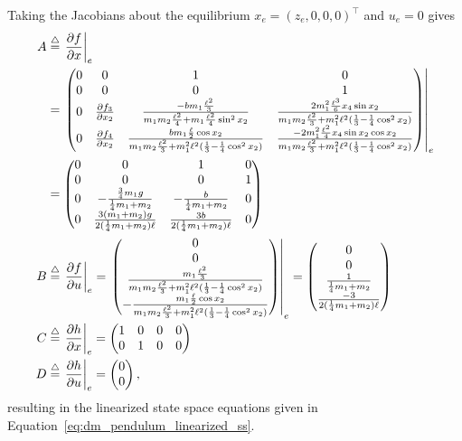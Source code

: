Taking the Jacobians about the equilibrium $x_e=(z_e, 0, 0, 0)^\top$ and $u_e=0$ gives
\begin{align*}
A&\stackrel{\triangle}{=} \left.\frac{\partial f}{\partial x}\right|_e \\
	&= \left.\begin{pmatrix} 
		0 & 0 & 1 & 0 \\
		0 & 0 & 0 & 1 \\
		0 & \frac{\partial f_3}{\partial x_2} & \frac{-bm_1\frac{\ell^2}{3}}{m_1m_2\frac{\ell^2}{4}+m_1\frac{\ell^2}{4}\sin^2 x_2} & \frac{2m_1^2\frac{\ell^3}{6} x_4\sin x_2}{m_1m_2\frac{\ell^2}{3} + m_1^2 \ell^2(\frac{1}{3} -\frac{1}{4}\cos^2x_2)} \\
		0 & \frac{\partial f_4}{\partial x_2} & \frac{bm_1\frac{\ell}{2}\cos x_2}{m_1m_2\frac{\ell^2}{3} + m_1^2 \ell^2(\frac{1}{3} -\frac{1}{4}\cos^2x_2)} & \frac{-2m_1^2\frac{\ell^2}{4} x_4 \sin x_2 \cos x_2}{m_1m_2\frac{\ell^2}{3} + m_1^2 \ell^2(\frac{1}{3} -\frac{1}{4}\cos^2x_2)}  \end{pmatrix}\right|_e \\
		&= \begin{pmatrix} 0 & 0 & 1 & 0 \\ 0 & 0 & 0 & 1 \\ 0 & -\frac{\frac{3}{4} m_1g}{\frac{1}{4}m_1 + m_2} & -\frac{b}{\frac{1}{4}m_1 + m_2} & 0 \\ 0 & \frac{3 (m_1+m_2)g}{2 (\frac{1}{4}m_1 + m_2)\ell} & \frac{3b}{2(\frac{1}{4}m_1 + m_2)\ell} & 0 \end{pmatrix} \\
B&\stackrel{\triangle}{=} \left.\frac{\partial f}{\partial u}\right|_e = \left.\begin{pmatrix} 0 \\ 0 \\ \frac{m_1\frac{\ell^2}{3}}{m_1m_2\frac{\ell^2}{3} + m_1^2 \ell^2(\frac{1}{3} -\frac{1}{4}\cos^2 x_2)} \\ -\frac{m_1\frac{\ell}{2}\cos x_2}{m_1m_2\frac{\ell^2}{3} + m_1^2 \ell^2(\frac{1}{3} -\frac{1}{4}\cos^2x_2)} \end{pmatrix}\right|_e 
= \begin{pmatrix} 0 \\ 0 \\ \frac{1}{\frac{1}{4}m_1 + m_2} \\  \frac{-3}{2(\frac{1}{4}m_1 + m_2)\ell} \end{pmatrix} \\
C&\stackrel{\triangle}{=} \left.\frac{\partial h}{\partial x}\right|_e = \begin{pmatrix} 1 & 0 & 0 & 0 \\ 0 & 1 & 0 & 0 \end{pmatrix} \\
D&\stackrel{\triangle}{=} \left.\frac{\partial h}{\partial u}\right|_e = \begin{pmatrix} 0 \\ 0 \end{pmatrix},
\end{align*}
resulting in the linearized state space equations given in Equation~\eqref{eq:dm_pendulum_linearized_ss}.

